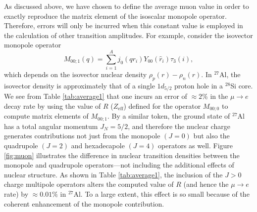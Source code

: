 \documentclass[12pt,letterpaper]{book}
\begin{document}
As discussed above, we have chosen to define the average muon value in order to exactly reproduce the matrix element of the isoscalar monopole operator. Therefore, errors will only be incurred when this constant value is employed in the calculation of other transition amplitudes. For example, consider the isovector monopole operator 
\begin{equation}
M_{00;1}(q)=\sum_{i=1}^A j_0(qr_i)Y_{00}(\hat{r}_i)\tau_3(i),
\end{equation}
which depends on the isovector nuclear density $\rho_{p}(r)-\rho_{n}(r)$. In $^{27}$Al, the isovector density is approximately that of a single $1d_{5/2}$ proton hole in a $^{28}$Si core. We see from Table \ref{tab:average1} that one incurs an error of $\approx 2$\% in the $\mu\rightarrow e$ decay rate by using the value of $R$ ($Z_\mathrm{eff}$) defined for the operator $M_{00;0}$ to compute matrix elements of $M_{00;1}$. By a similar token, the ground state of $^{27}$Al has a total angular momentum $J_N=5/2$, and therefore the nuclear charge generates contributions not just from the monopole $(J=0)$ but also the quadrupole $(J=2)$ and hexadecapole $(J=4)$ operators as well. Figure \ref{fig:muon} illustrates the difference in nuclear transition densities between the monopole and quadrupole operators---not including the additional effects of nuclear structure. As shown in Table \ref{tab:average1}, the inclusion of the $J>0$ charge multipole operators alters the computed value of $R$ (and hence the $\mu\rightarrow e$ rate) by $\approx 0.01\%$ in $^{27}$Al. To a large extent, this effect is so small because of the coherent enhancement of the monopole contribution.
\renewcommand{\arraystretch}{1.2}
\end{document}
